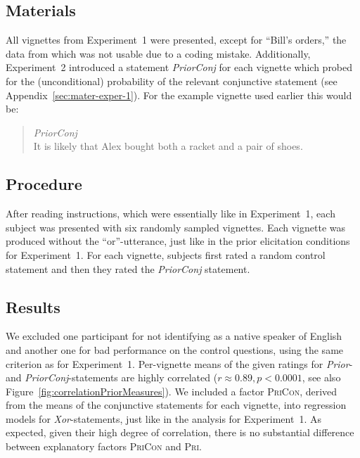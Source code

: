 \documentclass[12pt]{article}
\begin{document}
\subsection*{Materials}

All vignettes from Experiment~1 were presented, except for ``Bill's orders,'' the data from
which was not usable due to a coding mistake. Additionally, Experiment~2 introduced a statement
\emph{PriorConj} for each vignette which probed for the (unconditional) probability of the
relevant conjunctive statement (see Appendix~\ref{sec:mater-exper-1}). For the example vignette
used earlier this would be:

\begin{quote}
  \emph{PriorConj} \\ It is likely that Alex bought both a racket and a pair of shoes.
\end{quote}

\subsection*{Procedure}

After reading instructions, which were essentially like in Experiment~1, each subject was
presented with six randomly sampled vignettes. Each vignette was produced without the
``or''-utterance, just like in the prior elicitation conditions for Experiment~1. For each
vignette, subjects first rated a random control statement and then they rated the
\emph{PriorConj} statement.

\subsection*{Results}

We excluded one participant for not identifying as a native speaker of English and another one
for bad performance on the control questions, using the same criterion as for
Experiment~1. Per-vignette means of the given ratings for \emph{Prior}- and
\emph{PriorConj}-statements are highly correlated ($r \approx 0.89, p < 0.0001$, see also
Figure~\ref{fig:correlationPriorMeasures}). We included a factor \textsc{PriCon}, derived from
the means of the conjunctive statements for each vignette, into regression models for
\emph{Xor}-statements, just like in the analysis for Experiment~1. As expected, given their
high degree of correlation, there is no substantial difference between explanatory factors
\textsc{PriCon} and \textsc{Pri}.
\end{document}
